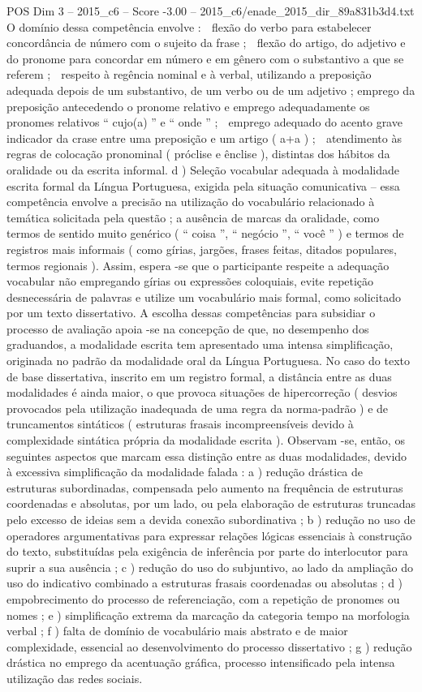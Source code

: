 \begin{textsample}{POS Dim 3 – 2015\_c6 – Score -3.00 – 2015\_c6/enade\_2015\_dir\_89a831b3d4.txt}
O domínio dessa competência envolve :  flexão do verbo para estabelecer concordância de número com o sujeito da frase ;  flexão do artigo, do adjetivo e do pronome para concordar em número e em gênero com o substantivo a que se referem ;  respeito à regência nominal e à verbal, utilizando a preposição adequada depois de um substantivo, de um verbo ou de um adjetivo ; emprego da preposição antecedendo o pronome relativo e emprego adequadamente os pronomes relativos “ cujo(a) ” e “ onde ” ;  emprego adequado do acento grave indicador da crase entre uma preposição e um artigo ( a+a ) ;  atendimento às regras de colocação pronominal ( próclise e ênclise ), distintas dos hábitos da oralidade ou da escrita informal. d ) Seleção vocabular adequada à modalidade escrita formal da Língua Portuguesa, exigida pela situação comunicativa – essa competência envolve a precisão na utilização do vocabulário relacionado à temática solicitada pela questão ; a ausência de marcas da oralidade, como termos de sentido muito genérico ( “ coisa ”, “ negócio ”, “ você ” ) e termos de registros mais informais ( como gírias, jargões, frases feitas, ditados populares, termos regionais ).
Assim, espera -se que o participante respeite a adequação vocabular não empregando gírias ou expressões coloquiais, evite repetição desnecessária de palavras e utilize um vocabulário mais formal, como solicitado por um texto dissertativo.
A escolha dessas competências para subsidiar o processo de avaliação apoia -se na concepção de que, no desempenho dos graduandos, a modalidade escrita tem apresentado uma intensa simplificação, originada no padrão da modalidade oral da Língua Portuguesa.
No caso do texto de base dissertativa, inscrito em um registro formal, a distância entre as duas modalidades é ainda maior, o que provoca situações de hipercorreção ( desvios provocados pela utilização inadequada de uma regra da norma-padrão ) e de truncamentos sintáticos ( estruturas frasais incompreensíveis devido à complexidade sintática própria da modalidade escrita ).
Observam -se, então, os seguintes aspectos que marcam essa distinção entre as duas modalidades, devido à excessiva simplificação da modalidade falada : a ) redução drástica de estruturas subordinadas, compensada pelo aumento na frequência de estruturas coordenadas e absolutas, por um lado, ou pela elaboração de estruturas truncadas pelo excesso de ideias sem a devida conexão subordinativa ; b ) redução no uso de operadores argumentativas para expressar relações lógicas essenciais à construção do texto, substituídas pela exigência de inferência por parte do interlocutor para suprir a sua ausência ; c ) redução do uso do subjuntivo, ao lado da ampliação do uso do indicativo combinado a estruturas frasais coordenadas ou absolutas ; d ) empobrecimento do processo de referenciação, com a repetição de pronomes ou nomes ; e ) simplificação extrema da marcação da categoria tempo na morfologia verbal ; f ) falta de domínio de vocabulário mais abstrato e de maior complexidade, essencial ao desenvolvimento do processo dissertativo ; g ) redução drástica no emprego da acentuação gráfica, processo intensificado pela intensa utilização das redes sociais.

\end{textsample}
